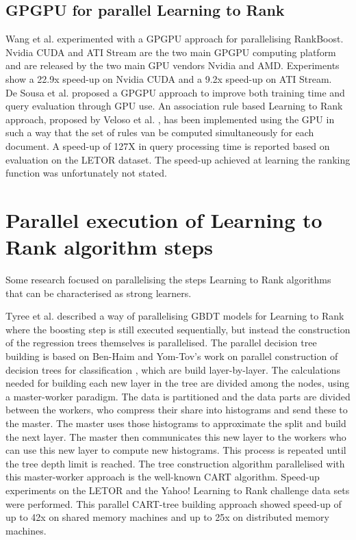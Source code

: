 \subsection{GPGPU for parallel Learning to Rank}
Wang et al. \cite{Wang2009} experimented with a \ac{GPGPU} approach for parallelising RankBoost. Nvidia \ac{CUDA} and ATI Stream are the two main \ac{GPGPU} computing platform and are released by the two main \ac{GPU} vendors Nvidia and AMD. Experiments show a 22.9x speed-up on Nvidia \ac{CUDA} and a 9.2x speed-up on ATI Stream.\\

De Sousa et al. \cite{DeSousa2012} proposed a \ac{GPGPU} approach to improve both training time and query evaluation through \ac{GPU} use. An association rule based Learning to Rank approach, proposed by Veloso et al. \cite{Veloso2008}, has been implemented using the \ac{GPU} in such a way that the set of rules van be computed simultaneously for each document. A speed-up of 127X in query processing time is reported based on evaluation on the LETOR dataset. The speed-up achieved at learning the ranking function was unfortunately not stated.\\

\section{Parallel execution of Learning to Rank algorithm steps}
Some research focused on parallelising the steps Learning to Rank algorithms that can be characterised as strong learners.

Tyree et al. \cite{Tyree2011} described a way of parallelising \ac{GBDT} models for Learning to Rank where the boosting step is still executed sequentially, but instead the construction of the regression trees themselves is parallelised. The parallel decision tree building is based on Ben-Haim and Yom-Tov's work on parallel construction of decision trees for classification \cite{Ben-Haim2010}, which are build layer-by-layer. The calculations needed for building each new layer in the tree are divided among the nodes, using a master-worker paradigm. The data is partitioned and the data parts are divided between the workers, who compress their share into histograms and send these to the master. The master uses those histograms to approximate the split and build the next layer. The master then communicates this new layer to the workers who can use this new layer to compute new histograms. This process is repeated until the tree depth limit is reached. The tree construction algorithm parallelised with this master-worker approach is the well-known \ac{CART} \cite{Breiman1984} algorithm. Speed-up experiments on the LETOR and the Yahoo! Learning to Rank challenge data sets were performed. This parallel \ac{CART}-tree building approach showed speed-up of up to 42x on shared memory machines and up to 25x on distributed memory machines.\\

